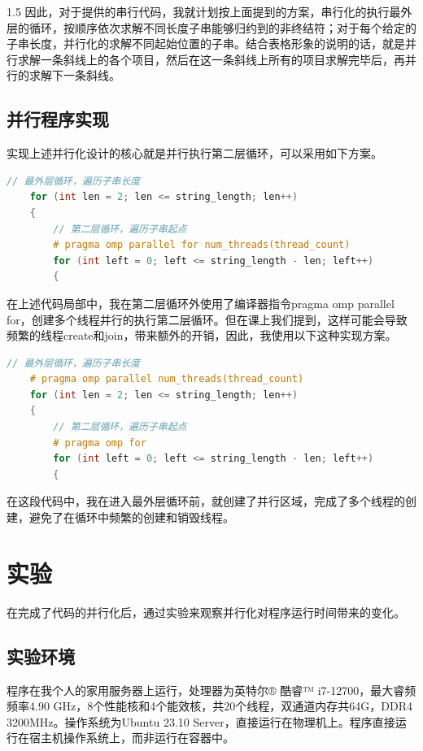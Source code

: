 \documentclass[zihao=-4]{ctexart}
\begin{document}
\begin{spacing}{1.5}
因此，对于提供的串行代码，我就计划按上面提到的方案，串行化的执行最外层的循环，按顺序依次求解不同长度子串能够归约到的非终结符；对于每个给定的子串长度，并行化的求解不同起始位置的子串。结合表格形象的说明的话，就是并行求解一条斜线上的各个项目，然后在这一条斜线上所有的项目求解完毕后，再并行的求解下一条斜线。

\subsection{并行程序实现}

实现上述并行化设计的核心就是并行执行第二层循环，可以采用如下方案。

\begin{lstlisting}[language=C++,title={并行代码实现方案}]
    // 最外层循环，遍历子串长度
    for (int len = 2; len <= string_length; len++)
    {
        // 第二层循环，遍历子串起点
        # pragma omp parallel for num_threads(thread_count)
        for (int left = 0; left <= string_length - len; left++)
        {
\end{lstlisting}

在上述代码局部中，我在第二层循环外使用了编译器指令pragma omp parallel for，创建多个线程并行的执行第二层循环。但在课上我们提到，这样可能会导致频繁的线程create和join，带来额外的开销，因此，我使用以下这种实现方案。

\begin{lstlisting}[language=C++,title={优化后的并行代码实现方案}]
    // 最外层循环，遍历子串长度
    # pragma omp parallel num_threads(thread_count)
    for (int len = 2; len <= string_length; len++)
    {
        // 第二层循环，遍历子串起点
        # pragma omp for
        for (int left = 0; left <= string_length - len; left++)
        {
\end{lstlisting}

在这段代码中，我在进入最外层循环前，就创建了并行区域，完成了多个线程的创建，避免了在循环中频繁的创建和销毁线程。

\section{实验}

在完成了代码的并行化后，通过实验来观察并行化对程序运行时间带来的变化。

\subsection{实验环境}

程序在我个人的家用服务器上运行，处理器为英特尔® 酷睿™ i7-12700，最大睿频频率4.90 GHz，8个性能核和4个能效核，共20个线程，双通道内存共64G，DDR4 3200MHz。操作系统为Ubuntu 23.10 Server，直接运行在物理机上。程序直接运行在宿主机操作系统上，而非运行在容器中。


\end{spacing}
\end{document}
